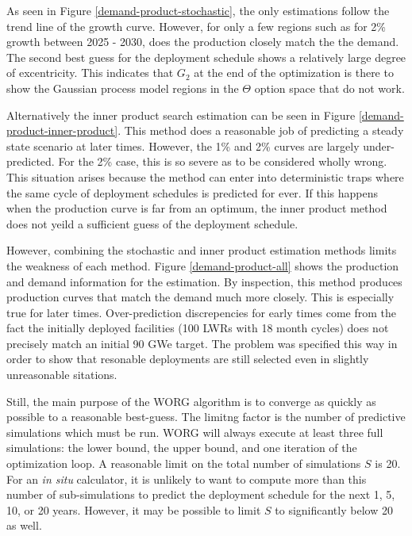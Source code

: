 As seen in Figure \ref{demand-product-stochastic}, the \stochastic only 
estimations follow the trend line of the growth curve.  However, for only 
a few regions such as for 2\% growth between 2025 - 2030, does the 
production closely match the the demand.  The second best guess for the 
deployment schedule shows a relatively large degree of excentricity. This 
indicates that $G_2$ at the end of the optimization is there to show the 
Gaussian process model regions in the $\Theta$ option space that do not work. 

Alternatively the inner product search estimation can be seen in Figure 
\ref{demand-product-inner-product}. This method does a reasonable job of
predicting a steady state scenario at later times. However, the 1\% and 2\%
curves are largely under-predicted.  For the 2\% case, this is so severe
as to be considered wholly wrong. This situation arises because the 
\innerprod method can enter into deterministic traps where the same cycle
of deployment schedules is predicted for ever.  If this happens when the 
production curve is far from an optimum, the inner product method does not
yeild a sufficient guess of the deployment schedule.

However, combining the stochastic and inner product estimation methods limits
the weakness of each method. Figure \ref{demand-product-all} shows the 
production and demand information for the \allflag estimation. By inspection, 
this method produces production curves that match the demand much more 
closely. This is especially true for later times. Over-prediction 
discrepencies for early times come from the fact the initially deployed 
facilities (100 LWRs with 18 month cycles) does not precisely match an 
initial 90 GWe target. The problem was specified this way in order to show 
that resonable deployments are still selected even in slightly 
unreasonable sitations.

Still, the main purpose of the WORG algorithm is to converge as quickly as 
possible to a reasonable best-guess. The limitng factor is the number of 
predictive simulations which must be run. WORG will always execute 
at least three full simulations: the lower bound, the upper bound, and one
iteration of the optimization loop. A reasonable limit on the total number 
of simulations $S$ is 20.  For an \emph{in situ} calculator, it is unlikely
to want to compute more than this number of sub-simulations to predict 
the deployment schedule for the next 1, 5, 10, or 20 years. However, it 
may be possible to limit $S$ to significantly below 20 as well.

